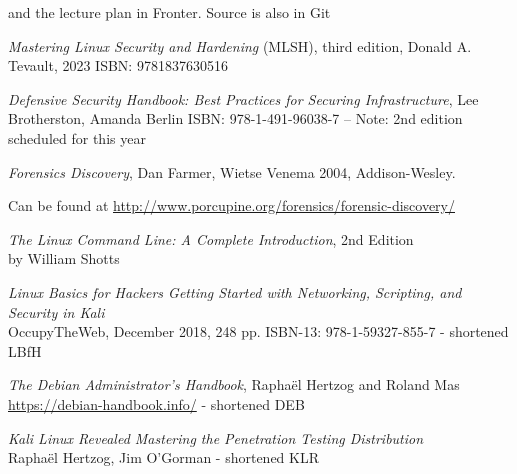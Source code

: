 \documentclass[Screen16to9,17pt]{foils}
\begin{document}
and the lecture plan in Fronter. Source is also in Git \\



\emph{Mastering Linux Security and Hardening} (MLSH), third edition, Donald A. Tevault, 2023  ISBN: 9781837630516
{\footnotesize{}}



\emph{Defensive Security Handbook: Best Practices for Securing Infrastructure}, Lee Brotherston, Amanda Berlin ISBN: 978-1-491-96038-7 -- Note: 2nd edition scheduled for this year

{\footnotesize{}}



\emph{Forensics Discovery}, Dan Farmer, Wietse Venema 2004, Addison-Wesley.

Can be found at \url{http://www.porcupine.org/forensics/forensic-discovery/}




\begin{list2}
\item \emph{The Linux Command Line: A Complete Introduction}, 2nd Edition\\
 by William Shotts
\item \emph{Linux Basics for Hackers Getting Started with Networking, Scripting, and Security in Kali}\\
OccupyTheWeb, December 2018, 248 pp. ISBN-13: 978-1-59327-855-7 - shortened LBfH
\item \emph{The Debian Administrator’s Handbook}, Raphaël Hertzog and Roland Mas\\
\url{https://debian-handbook.info/} - shortened DEB
\item \emph{Kali Linux Revealed  Mastering the Penetration Testing Distribution}\\
Raphaël Hertzog, Jim O'Gorman - shortened KLR
\end{list2}
\end{document}
